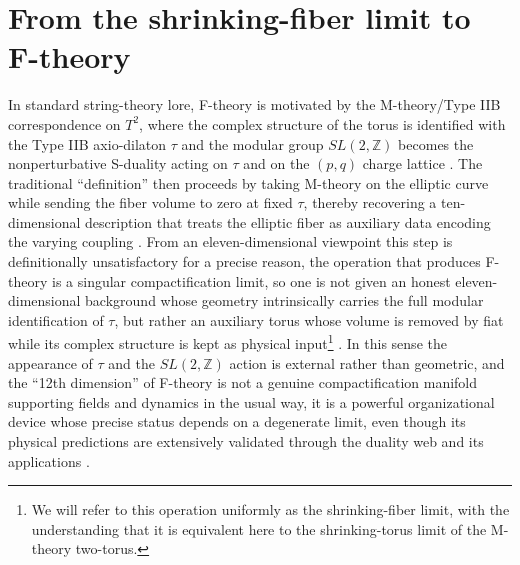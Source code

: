 \documentclass[11pt]{article}
\theoremstyle{remark}
\newcommand{\Z}{\mathbb{Z}}
\begin{document}
\section{From the shrinking-fiber limit to F-theory}

In standard string-theory lore, F-theory is motivated by the M-theory/Type IIB correspondence on \(T^{2}\), where the complex structure of the torus is identified with the Type IIB axio-dilaton \(\tau\) and the modular group \(SL(2,\Z)\) becomes the nonperturbative S-duality acting on \(\tau\) and on the \((p,q)\) charge lattice \cite{Vafa1996, Schwarz1995, Sen1996, MorrisonVafa1996a, MorrisonVafa1996b}. The traditional ``definition'' then proceeds by taking M-theory on the elliptic curve while sending the fiber volume to zero at fixed \(\tau\), thereby recovering a ten-dimensional description that treats the elliptic fiber as auxiliary data encoding the varying coupling \cite{Vafa1996, MorrisonVafa1996a, MorrisonVafa1996b}. From an eleven-dimensional viewpoint this step is definitionally unsatisfactory for a precise reason, the operation that produces F-theory is a singular compactification limit, so one is not given an honest eleven-dimensional background whose geometry intrinsically carries the full modular identification of \(\tau\), but rather an auxiliary torus whose volume is removed by fiat while its complex structure is kept as physical input\footnote{We will refer to this operation uniformly as the shrinking-fiber limit, with the understanding that it is equivalent here to the shrinking-torus limit of the M-theory two-torus.
} \cite{DasguptaMukhi1996, GopakumarVafa1998}. In this sense the appearance of \(\tau\) and the \(SL(2,\Z)\) action is external rather than geometric, and the ``12th dimension'' of F-theory is not a genuine compactification manifold supporting fields and dynamics in the usual way, it is a powerful organizational device whose precise status depends on a degenerate limit, even though its physical predictions are extensively validated through the duality web and its applications \cite{Polchinski1998}.
\end{document}
